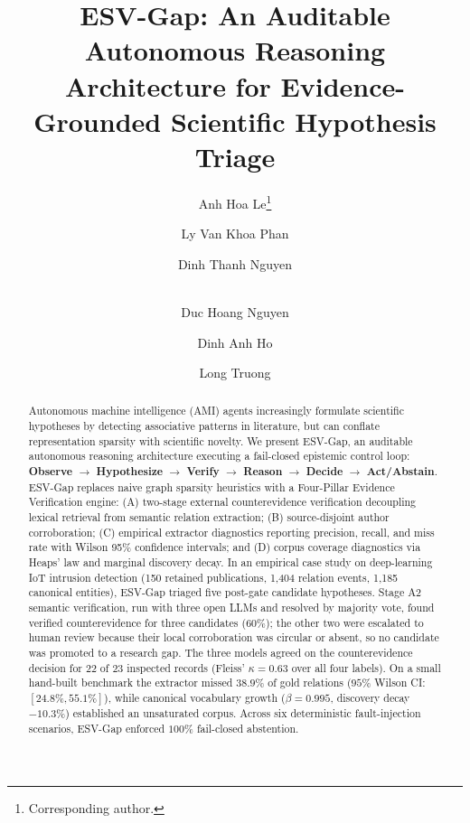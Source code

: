 \documentclass[runningheads]{llncs}
\newcommand{\method}{ESV-Gap}
\begin{document}
\title{ESV-Gap: An Auditable Autonomous Reasoning Architecture for Evidence-Grounded Scientific Hypothesis Triage}

\author{Anh Hoa Le\thanks{Corresponding author.} \and Ly Van Khoa Phan \and Dinh Thanh Nguyen \and\\ Duc Hoang Nguyen \and Dinh Anh Ho \and Long Truong}

\maketitle

\begin{abstract}
Autonomous machine intelligence (AMI) agents increasingly formulate scientific hypotheses by detecting associative patterns in literature, but can conflate representation sparsity with scientific novelty. We present \method{}, an auditable autonomous reasoning architecture executing a fail-closed epistemic control loop: \textbf{Observe} $\rightarrow$ \textbf{Hypothesize} $\rightarrow$ \textbf{Verify} $\rightarrow$ \textbf{Reason} $\rightarrow$ \textbf{Decide} $\rightarrow$ \textbf{Act/Abstain}. \method{} replaces naive graph sparsity heuristics with a Four-Pillar Evidence Verification engine: (A) two-stage external counterevidence verification decoupling lexical retrieval from semantic relation extraction; (B) source-disjoint author corroboration; (C) empirical extractor diagnostics reporting precision, recall, and miss rate with Wilson 95\% confidence intervals; and (D) corpus coverage diagnostics via Heaps' law and marginal discovery decay. In an empirical case study on deep-learning IoT intrusion detection (150 retained publications, 1,404 relation events, 1,185 canonical entities), \method{} triaged five post-gate candidate hypotheses. Stage A2 semantic verification, run with three open LLMs and resolved by majority vote, found verified counterevidence for three candidates ($60\%$); the other two were escalated to human review because their local corroboration was circular or absent, so no candidate was promoted to a research gap. The three models agreed on the counterevidence decision for 22 of 23 inspected records (Fleiss' $\kappa = 0.63$ over all four labels). On a small hand-built benchmark the extractor missed $38.9\%$ of gold relations ($95\%$ Wilson CI: $[24.8\%, 55.1\%]$), while canonical vocabulary growth ($\beta = 0.995$, discovery decay $-10.3\%$) established an unsaturated corpus. Across six deterministic fault-injection scenarios, \method{} enforced $100\%$ fail-closed abstention.

\end{abstract}
\end{document}
